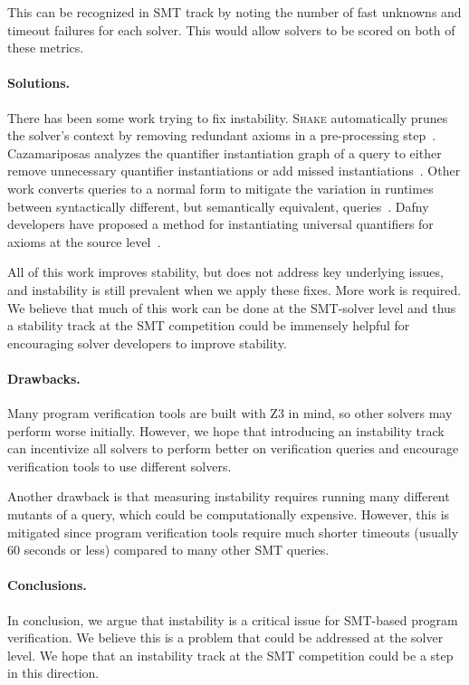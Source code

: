 \documentclass[
]{ceurart}
\newcommand{\shake}{\textsc{Shake}\xspace}
\newcommand{\caza}{Cazamariposas\xspace}
\begin{document}
\begin{itemize}
This can be recognized in SMT track by noting the number of fast unknowns and
timeout failures for each solver. This would allow solvers to be scored on both
of these metrics.


\end{itemize}

\paragraph{Solutions.} There has been some work trying to fix instability.
\shake automatically prunes the solver's context by removing redundant axioms in
a pre-processing step~\cite{shake}. \caza analyzes the quantifier instantiation
graph of a query to either remove unnecessary quantifier instantiations or add missed instantiations~\cite{cazamariposas}.
Other work converts queries to a normal form to mitigate the variation in
runtimes between syntactically different, but semantically equivalent,
queries~\cite{normalize}. Dafny developers have proposed a method for instantiating universal
quantifiers for axioms at the source level~\cite{free-facts}.

All of this work improves stability, but does not address key
underlying issues, and instability is still prevalent when we apply these fixes.
More work is required. We believe that much of this work can be done at the SMT-solver level and thus a stability track at the SMT competition could be
immensely helpful for encouraging solver developers to improve stability.

\paragraph{Drawbacks.} Many program verification tools are built with Z3 in
mind, so other solvers may perform worse initially. However, we hope that
introducing an instability track can incentivize all solvers to perform
better on verification queries and encourage verification tools to use different
solvers.

Another drawback is that measuring instability requires running many different
mutants of a query, which could be computationally expensive. However, this is
mitigated since program verification tools require much shorter timeouts
(usually 60 seconds or less) compared to many other SMT queries.

\paragraph{Conclusions.} In conclusion, we argue that instability is a critical
issue for SMT-based program verification. We believe this is a problem that
could be addressed at the solver level. We hope that an instability track at the
SMT competition could be a step in this direction.
\end{document}
